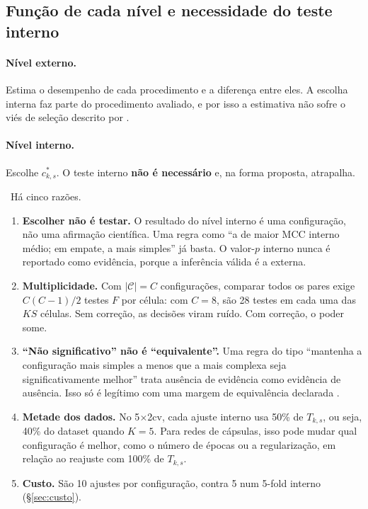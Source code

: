 \documentclass[11pt,a4paper]{article}
\newcommand{\etiqueta}[2]{\tcbox[on line, colback=#1!10, colframe=#1!75!black,
  boxrule=0.4pt, arc=1.2pt, left=1.5pt, right=1.5pt, top=0pt, bottom=0pt,
  fontupper=\sffamily\scriptsize\bfseries]{#2}}
\newcommand{\rec}{\etiqueta{oiVerm}{Recomendação}}
\begin{document}
\subsection{Função de cada nível e necessidade do teste interno}

\paragraph{Nível externo.} Estima o desempenho de cada procedimento e a diferença entre eles. A escolha interna faz parte do procedimento avaliado, e por isso a estimativa não sofre o viés de seleção descrito por \citet{varma2006}.

\paragraph{Nível interno.} Escolhe $c^\ast_{k,s}$. O teste interno \textbf{não é necessário} e, na forma proposta, atrapalha.

\rec\ Há cinco razões.
\begin{enumerate}[leftmargin=1.4em]
\item \textbf{Escolher não é testar.} O resultado do nível interno é uma configuração, não uma afirmação científica. Uma regra como ``a de maior MCC interno médio; em empate, a mais simples'' já basta. O valor-$p$ interno nunca é reportado como evidência, porque a inferência válida é a externa.
\item \textbf{Multiplicidade.} Com $|\mathcal{C}|=C$ configurações, comparar todos os pares exige $C(C-1)/2$ testes $F$ por célula: com $C=8$, são 28 testes em cada uma das $KS$ células. Sem correção, as decisões viram ruído. Com correção, o poder some.
\item \textbf{``Não significativo'' não é ``equivalente''.} Uma regra do tipo ``mantenha a configuração mais simples a menos que a mais complexa seja significativamente melhor'' trata ausência de evidência como evidência de ausência. Isso só é legítimo com uma margem de equivalência declarada \citep{lakens2017}.
\item \textbf{Metade dos dados.} No 5$\times$2cv, cada ajuste interno usa 50\% de $T_{k,s}$, ou seja, 40\% do dataset quando $K=5$. Para redes de cápsulas, isso pode mudar qual configuração é melhor, como o número de épocas ou a regularização, em relação ao reajuste com 100\% de $T_{k,s}$.
\item \textbf{Custo.} São 10 ajustes por configuração, contra 5 num 5-fold interno (\S\ref{sec:custo}).
\end{enumerate}
\end{document}
